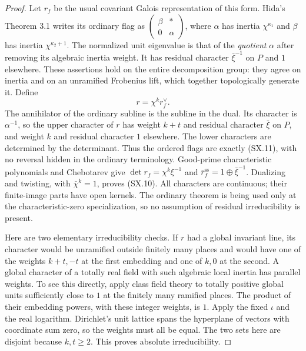 \begin{proof}
Let $r_f$ be the usual covariant Galois representation of this
form.  Hida's Theorem 3.1 writes its ordinary flag as
$\left(\begin{smallmatrix}\beta&*\\0&\alpha\end{smallmatrix}\right)$,
where $\alpha$ has inertia $\chi^{\kappa_1}$ and $\beta$ has
inertia $\chi^{\kappa_2+1}$.  The normalized unit eigenvalue is
that of the \emph{quotient} $\alpha$ after removing its algebraic
inertia weight.  It has residual character $\bar\xi^{-1}$ on
$P$ and $1$ elsewhere.  These assertions hold on the entire
decomposition group: they agree on inertia and on an unramified
Frobenius lift, which together topologically generate it.
Define
\[
                         r=\chi^k r_f^\vee.
\]
The annihilator of the ordinary subline is the subline in the
dual.  Its character is $\alpha^{-1}$, so the upper character
of $r$ has weight $k+t$ and residual character $\bar\xi$ on
$P$, and weight $k$ and residual character $1$ elsewhere.
The lower characters are determined by the determinant.  Thus
the ordered flags are exactly (SX.11), with no reversal hidden
in the ordinary terminology.  Good-prime characteristic
polynomials and Chebotarev give
$\det r_f=\chi^k\xi^{-1}$ and
$\bar r_f^{\mathrm{ss}}=1\oplus\bar\xi^{-1}$.
Dualizing and twisting, with $\bar\chi^k=1$, proves (SX.10).
All characters are continuous; their finite-image parts have open
kernels.  The ordinary theorem is being used only at the
characteristic-zero specialization, so no assumption of residual
irreducibility is present.

Here are two elementary irreducibility checks.  If $r$ had a
global invariant line, its character would be unramified outside
finitely many places and would have one of the weights $k+t,-t$
at the first embedding and one of $k,0$ at the second.  A global
character of a totally real field with such algebraic local
inertia has parallel weights.  To see this directly, apply class
field theory to totally positive global units sufficiently close
to $1$ at the finitely many ramified places.  The product of their
embedding powers, with these integer weights, is $1$.  Apply the
fixed $\iota$ and the real logarithm.  Dirichlet's unit lattice
spans the hyperplane of vectors with coordinate sum zero, so the
weights must all be equal.  The two sets here are disjoint because
$k,t\ge2$.  This proves absolute irreducibility.


\end{proof}
